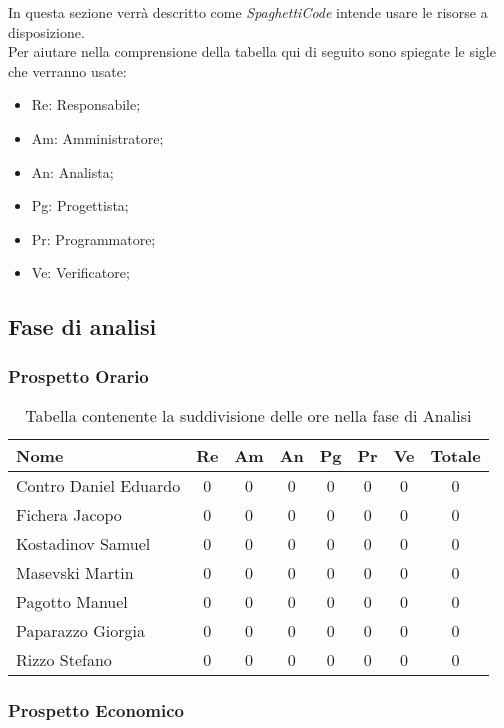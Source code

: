 \documentclass[../piano_di_progetto.tex]{subfiles}
\begin{document}
In questa sezione verrà descritto come \emph{SpaghettiCode} intende usare le risorse a disposizione. \\
Per aiutare nella comprensione della tabella qui di seguito sono spiegate le sigle che verranno usate:
\begin{itemize}
\item Re: Responsabile;
\item Am: Amministratore;
\item An: Analista;
\item Pg: Progettista;
\item Pr: Programmatore;
\item Ve: Verificatore;
\end{itemize}


\subsection{ Fase di analisi}%
\label{sub:fase_analisi}
\subsubsection{Prospetto Orario}


\begin{table}[!ht]

	\centering
	\begin{tabular}{|l|c|c|c|c|c|c|c|}
	\hline
	\rowcolor{lightgray}
	\textbf{Nome} & \textbf{Re} & \textbf{Am} & \textbf{An} & \textbf{Pg}  & \textbf{Pr}   & \textbf{Ve} & \textbf{Totale} \\

	\hline
		Contro Daniel Eduardo & 0 & 0 & 0 & 0 & 0 & 0 & 0 \\
	\hline
		Fichera Jacopo & 0 & 0 & 0 & 0 & 0 & 0 & 0 \\
	\hline
		Kostadinov Samuel & 0 & 0 & 0 & 0 & 0 & 0 & 0 \\			
	\hline
		Masevski Martin & 0 & 0 & 0 & 0 & 0 & 0 & 0 \\
	\hline
		Pagotto Manuel & 0 & 0 & 0 & 0 & 0 & 0 & 0 \\			
	\hline
		Paparazzo Giorgia & 0 & 0 & 0 & 0 & 0 & 0 & 0 \\
	\hline
		Rizzo Stefano & 0 & 0 & 0 & 0 & 0 & 0 & 0 \\
	\hline	
	\end{tabular}
	\caption{Tabella contenente la suddivisione delle ore nella fase di Analisi}
\end{table}


\subsubsection{Prospetto Economico}
\end{document}
